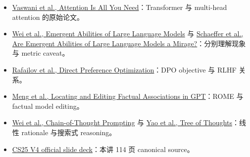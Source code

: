 \begin{itemize}
  \item \href{https://arxiv.org/abs/1706.03762}{Vaswani et al., Attention Is All You Need}：Transformer 与 multi-head attention 的原始论文。
  \item \href{https://arxiv.org/abs/2206.07682}{Wei et al., Emergent Abilities of Large Language Models} 与 \href{https://arxiv.org/abs/2304.15004}{Schaeffer et al., Are Emergent Abilities of Large Language Models a Mirage?}：分别理解现象与 metric caveat。
  \item \href{https://arxiv.org/abs/2305.18290}{Rafailov et al., Direct Preference Optimization}：DPO objective 与 RLHF 关系。
  \item \href{https://arxiv.org/abs/2202.05262}{Meng et al., Locating and Editing Factual Associations in GPT}：ROME 与 factual model editing。
  \item \href{https://arxiv.org/abs/2201.11903}{Wei et al., Chain-of-Thought Prompting} 与 \href{https://arxiv.org/abs/2305.10601}{Yao et al., Tree of Thoughts}：线性 rationale 与搜索式 reasoning。
  \item \href{https://docs.google.com/presentation/d/1oXPs3LXtIVIsVbwTyGjAWj_aWvak9c1uNC4uhkS6glk/edit}{CS25 V4 official slide deck}：本讲 114 页 canonical source。
\end{itemize}


